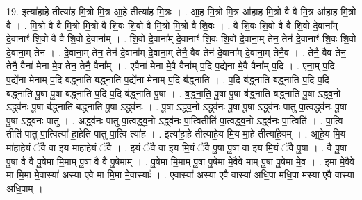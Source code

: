 \documentclass[17pt]{extarticle}
\begin{document}
19. इत्या॑हा॒हे तीत्या॑ह मि॒त्रो मि॒त्र आ॒हे तीत्या॑ह मि॒त्रः । . आ॒ह॒ मि॒त्रो मि॒त्र आ॑हाह मि॒त्रो वै वै मि॒त्र आ॑हाह मि॒त्रो वै । . मि॒त्रो वै वै मि॒त्रो मि॒त्रो वै शि॒वः शि॒वो वै मि॒त्रो मि॒त्रो वै शि॒वः । . वै शि॒वः शि॒वो वै वै शि॒वो दे॒वाना᳚म् दे॒वानाꣳ॑ शि॒वो वै वै शि॒वो दे॒वाना᳚म् । . शि॒वो दे॒वाना᳚म् दे॒वानाꣳ॑ शि॒वः शि॒वो दे॒वाना॒म् तेन॒ तेन॑ दे॒वानाꣳ॑ शि॒वः शि॒वो दे॒वाना॒म् तेन॑ । . दे॒वाना॒म् तेन॒ तेन॑ दे॒वाना᳚म् दे॒वाना॒म् तेनै॒ वैव तेन॑ दे॒वाना᳚म् दे॒वाना॒म् तेनै॒व । . तेनै॒ वैव तेन॒ तेनै॒ वैना॑ मेना मे॒व तेन॒ तेनै॒ वैना᳚म् । . ए॒वैना॑ मेना मे॒वै वैना᳚म् प॒दि प॒द्ये॑ना मे॒वै वैना᳚म् प॒दि । . ए॒ना॒म् प॒दि प॒द्ये॑ना मेनाम् प॒दि ब॑द्ध्नाति बद्ध्नाति प॒द्ये॑ना मेनाम् प॒दि ब॑द्ध्नाति । . प॒दि ब॑द्ध्नाति बद्ध्नाति प॒दि प॒दि ब॑द्ध्नाति पू॒षा पू॒षा ब॑द्ध्नाति प॒दि प॒दि ब॑द्ध्नाति पू॒षा । . ब॒द्ध्ना॒ति॒ पू॒षा पू॒षा ब॑द्ध्नाति बद्ध्नाति पू॒षा ऽद्ध्व॒नो ऽद्ध्व॑नः पू॒षा ब॑द्ध्नाति बद्ध्नाति पू॒षा ऽद्ध्व॑नः । . पू॒षा ऽद्ध्व॒नो ऽद्ध्व॑नः पू॒षा पू॒षा ऽद्ध्व॑नः पातु पा॒त्वद्ध्व॑नः पू॒षा पू॒षा ऽद्ध्व॑नः पातु । . अद्ध्व॑नः पातु पा॒त्वद्ध्व॒नो ऽद्ध्व॑नः पा॒त्वितीति॑ पा॒त्वद्ध्व॒नो ऽद्ध्व॑नः पा॒त्विति॑ । . पा॒त्वि तीति॑ पातु पा॒त्वित्या॑ हा॒हेति॑ पातु पा॒त्वि त्या॑ह । . इत्या॑हा॒हे तीत्या॑हे॒य मि॒य मा॒हे तीत्या॑हे॒यम् । . आ॒हे॒य मि॒य मा॑हाहे॒यं ॅवै वा इ॒य मा॑हाहे॒यं ॅवै । . इ॒यं ॅवै वा इ॒य मि॒यं ॅवै पू॒षा पू॒षा वा इ॒य मि॒यं ॅवै पू॒षा । . वै पू॒षा पू॒षा वै वै पू॒षेमा मि॒माम् पू॒षा वै वै पू॒षेमाम् । . पू॒षेमा मि॒माम् पू॒षा पू॒षेमा मे॒वैवे माम् पू॒षा पू॒षेमा मे॒व । . इ॒मा मे॒वैवे मा मि॒मा मे॒वास्या॑ अस्या ए॒वे मा मि॒मा मे॒वास्याः᳚ । . ए॒वास्या॑ अस्या ए॒वै वास्या॑ अधि॒पा म॑धि॒पा म॑स्या ए॒वै वास्या॑ अधि॒पाम् । \newline
\end{document}
